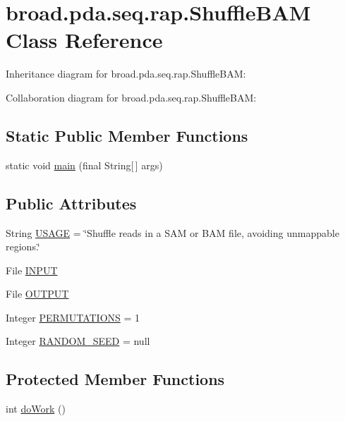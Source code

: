 \hypertarget{classbroad_1_1pda_1_1seq_1_1rap_1_1_shuffle_b_a_m}{\section{broad.\+pda.\+seq.\+rap.\+Shuffle\+B\+A\+M Class Reference}
\label{classbroad_1_1pda_1_1seq_1_1rap_1_1_shuffle_b_a_m}
}


Inheritance diagram for broad.\+pda.\+seq.\+rap.\+Shuffle\+B\+A\+M\+:


Collaboration diagram for broad.\+pda.\+seq.\+rap.\+Shuffle\+B\+A\+M\+:
\subsection*{Static Public Member Functions}
\begin{DoxyCompactItemize}
\item 
static void \hyperlink{classbroad_1_1pda_1_1seq_1_1rap_1_1_shuffle_b_a_m_a1acd0f381e3a1478b3062f0edf03a8b0}{main} (final String\mbox{[}$\,$\mbox{]} args)
\end{DoxyCompactItemize}
\subsection*{Public Attributes}
\begin{DoxyCompactItemize}
\item 
String \hyperlink{classbroad_1_1pda_1_1seq_1_1rap_1_1_shuffle_b_a_m_af9a7333a82eb692c4bf47d824f885891}{U\+S\+A\+G\+E} = \char`\"{}Shuffle reads in a S\+A\+M or B\+A\+M file, avoiding unmappable regions.\char`\"{}
\item 
File \hyperlink{classbroad_1_1pda_1_1seq_1_1rap_1_1_shuffle_b_a_m_a45600d33be8564cd09136414acc055f8}{I\+N\+P\+U\+T}
\item 
File \hyperlink{classbroad_1_1pda_1_1seq_1_1rap_1_1_shuffle_b_a_m_a123a1bf0fef5db0722896d10c02c7b7e}{O\+U\+T\+P\+U\+T}
\item 
Integer \hyperlink{classbroad_1_1pda_1_1seq_1_1rap_1_1_shuffle_b_a_m_a362cbea962f9fe7e06bf777ea41a8062}{P\+E\+R\+M\+U\+T\+A\+T\+I\+O\+N\+S} = 1
\item 
Integer \hyperlink{classbroad_1_1pda_1_1seq_1_1rap_1_1_shuffle_b_a_m_abb97899b7b215ebc5044c8de2dcdd75f}{R\+A\+N\+D\+O\+M\+\_\+\+S\+E\+E\+D} = null
\end{DoxyCompactItemize}
\subsection*{Protected Member Functions}
\begin{DoxyCompactItemize}
\item 
int \hyperlink{classbroad_1_1pda_1_1seq_1_1rap_1_1_shuffle_b_a_m_af832d2dc5484b49905429f242f6dd3f5}{do\+Work} ()
\end{DoxyCompactItemize}

